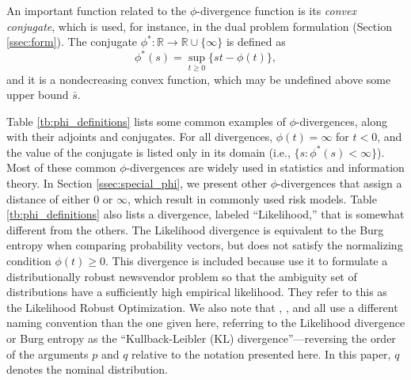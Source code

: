 \documentclass[opre,nonblindrev]{informs3} %
\newcommand{\R}{{\mathbb{R}}}
\begin{document}
An important function related to the $\phi$-divergence function is its  {\it  convex conjugate}, which is used, for instance, in the dual problem formulation (Section \ref{ssec:form}). 
The conjugate $\phi^* : \R \rightarrow \R \cup \{\infty\}$ is defined as
\begin{equation} \label{eq:conjugate}
	\phi^*(s) = \sup_{t \geq 0} \{st - \phi(t)\},
\end{equation}
and it is a nondecreasing convex function, which may be undefined above some upper bound $\bar{s}$.

Table \ref{tb:phi_definitions} lists some common examples of $\phi$-divergences, along with their adjoints and conjugates.
For all divergences, $\phi(t) = \infty$ for $t < 0$, and the value of the conjugate is listed only in its domain (i.e., $\{s : \phi^*(s) < \infty\}$).
Most of these common  $\phi$-divergences are widely used in statistics and information theory.
In Section \ref{ssec:special_phi}, we present other $\phi$-divergences that assign a distance of either $0$ or $\infty$, which result in commonly used risk models.
Table \ref{tb:phi_definitions} also lists a divergence, labeled ``Likelihood,'' that is somewhat different from the others.
The Likelihood divergence is equivalent to the Burg entropy when comparing probability vectors, but does not satisfy the normalizing condition $\phi(t) \geq 0$.
This divergence is included because \citet{wang2010likelihood} use it to formulate a distributionally robust newsvendor problem so that the ambiguity set of distributions have a sufficiently high empirical likelihood. 
They refer to this as the Likelihood Robust Optimization. 
We also note that \citep{calafiore2007ambiguous}, \citep{hukullback}, and \citep{wang2010likelihood} all use a different naming convention than the one given here, referring to the Likelihood divergence or Burg entropy as the ``Kullback-Leibler (KL) divergence''---reversing the order of the arguments $p$ and $q$ relative to the notation presented here.
In this paper, $q$ denotes the  nominal distribution.
\end{document}
